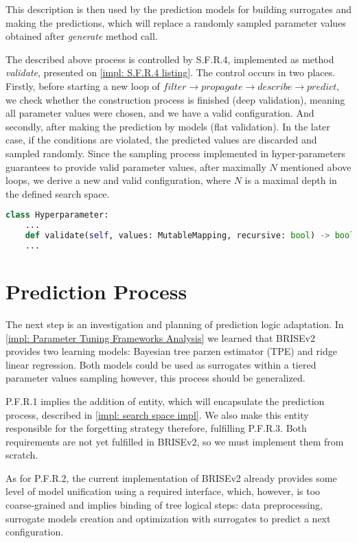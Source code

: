 This description is then used by the prediction models for building surrogates and making the predictions, which will replace a randomly sampled parameter values obtained after \emph{generate} method call.

The described above process is controlled by S.F.R.4, implemented as method \emph{validate}, presented on \cref{impl: S.F.R.4 listing}. The control occurs in two places. Firstly, before starting a new loop of $filter \rightarrow propagate \rightarrow describe \rightarrow predict$, we check whether the construction process is finished (deep validation), meaning all parameter values were chosen, and we have a valid configuration. And secondly, after making the prediction by models (flat validation). In the later case, if the conditions are violated, the predicted values are discarded and sampled randomly. Since the sampling process implemented in hyper-parameters guarantees to provide valid parameter values, after maximally $N$ mentioned above loops, we derive a new and valid configuration, where $N$ is a maximal depth in the defined search space.

\begin{lstlisting}[language=Python, caption=S.F.R.4 implementation., label=impl: S.F.R.4 listing]
class Hyperparameter:
	...
	def validate(self, values: MutableMapping, recursive: bool) -> bool: pass
	...
\end{lstlisting}


\section{Prediction Process}\label{impl: prediction logic}
The next step is an investigation and planning of prediction logic adaptation.
In \cref{impl: Parameter Tuning Frameworks Analysis} we learned that BRISEv2 provides two learning models: Bayesian tree parzen estimator (TPE) and ridge linear regression. Both models could be used as surrogates within a tiered parameter values sampling however, this process should be generalized.

P.F.R.1 implies the addition of entity, which will encapsulate the prediction process, described in \cref{impl: search space impl}. We also make this entity responsible for the forgetting strategy therefore, fulfilling P.F.R.3. Both requirements are not yet fulfilled in BRISEv2, so we must implement them from scratch.

As for P.F.R.2, the current implementation of BRISEv2 already provides some level of model unification using a required interface, which, however, is too coarse-grained and implies binding of tree logical steps: data preprocessing, surrogate models creation and optimization with surrogates to predict a next configuration.

